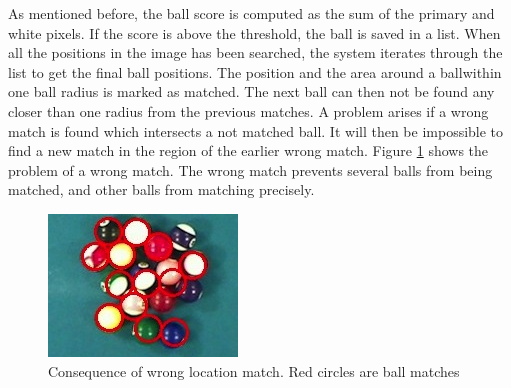 As mentioned before, the ball score is computed as the sum of the primary and white pixels. If the score is above the threshold, the ball is saved in a list. When all the positions in the image has been searched, the system iterates through the list to get the final ball positions. The position and the area around  a ballwithin one ball radius is marked as matched. The next ball can then not be found any closer than one radius from the previous matches. A problem arises if a wrong match is found which intersects a not matched ball. It will then be impossible to find a new match in the region of the earlier wrong match.
Figure \ref{fig:wronglocate} shows the problem of a wrong match. The wrong match prevents several balls from being matched, and other balls from matching precisely.
\begin{figure}[h]
\begin{center}
\includegraphics{images/wronglocate.jpg}
\caption{Consequence of wrong location match. Red circles are ball matches}
\label{fig:wronglocate}
\end{center}
\end{figure}